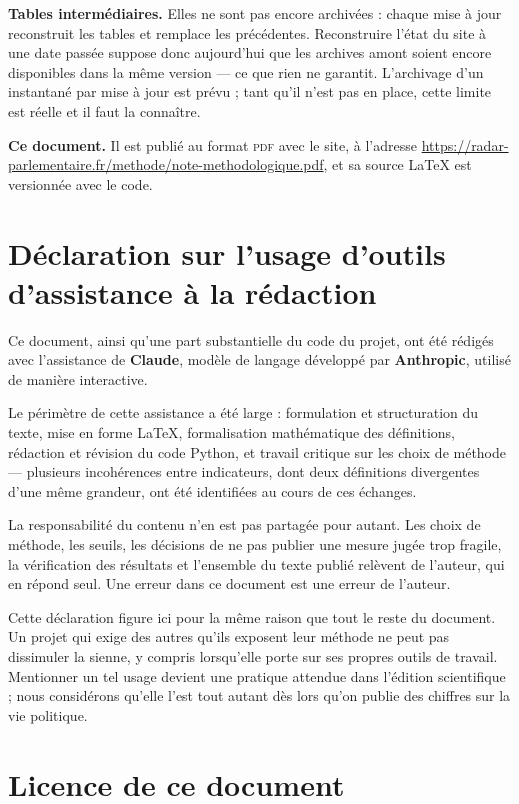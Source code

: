 \documentclass[11pt,a4paper]{article}
\begin{document}
\textbf{Tables intermédiaires.} Elles ne sont pas encore archivées : chaque
mise à jour reconstruit les tables et remplace les précédentes. Reconstruire
l'état du site à une date passée suppose donc aujourd'hui que les archives
amont soient encore disponibles dans la même version — ce que rien ne
garantit. L'archivage d'un instantané par mise à jour est prévu ; tant qu'il
n'est pas en place, cette limite est réelle et il faut la connaître.

\textbf{Ce document.} Il est publié au format \textsc{pdf} avec le site, à
l'adresse \url{https://radar-parlementaire.fr/methode/note-methodologique.pdf},
et sa source \LaTeX{} est versionnée avec le code.

\section{Déclaration sur l'usage d'outils d'assistance à la rédaction}
\label{sec:ia}

Ce document, ainsi qu'une part substantielle du code du projet, ont été
rédigés avec l'assistance de \textbf{Claude}, modèle de langage développé par
\textbf{Anthropic}, utilisé de manière interactive.

Le périmètre de cette assistance a été large : formulation et structuration du
texte, mise en forme \LaTeX{}, formalisation mathématique des définitions,
rédaction et révision du code Python, et travail critique sur les choix de
méthode — plusieurs incohérences entre indicateurs, dont deux définitions
divergentes d'une même grandeur, ont été identifiées au cours de ces échanges.

La responsabilité du contenu n'en est pas partagée pour autant. Les choix de
méthode, les seuils, les décisions de ne pas publier une mesure jugée trop
fragile, la vérification des résultats et l'ensemble du texte publié relèvent
de l'auteur, qui en répond seul. Une erreur dans ce document est une erreur de
l'auteur.

Cette déclaration figure ici pour la même raison que tout le reste du
document. Un projet qui exige des autres qu'ils exposent leur méthode ne peut
pas dissimuler la sienne, y compris lorsqu'elle porte sur ses propres outils
de travail. Mentionner un tel usage devient une pratique attendue dans
l'édition scientifique ; nous considérons qu'elle l'est tout autant dès lors
qu'on publie des chiffres sur la vie politique.

\section*{Licence de ce document}
\end{document}
